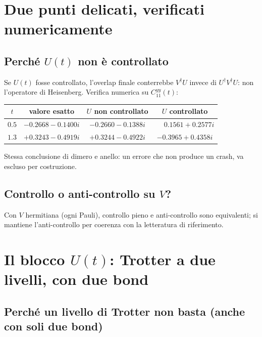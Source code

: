 \documentclass[11pt,a4paper]{article}
\begin{document}
\section{Due punti delicati, verificati numericamente}

\subsection{Perché $U(t)$ non è controllato}

Se $U(t)$ fosse controllato, l'overlap finale conterrebbe $V^\dagger U$ invece di
$U^\dagger V^\dagger U$: non l'operatore di Heisenberg. Verifica numerica su $C_{11}^{yy}(t)$:

\begin{center}
\begin{tabular}{cccc}
\toprule
$t$ & valore esatto & $U$ non controllato & $U$ controllato \\
\midrule
$0.5$ & $-0.2668-0.1400i$ & $-0.2660-0.1388i$ & $\phantom{-}0.1561+0.2577i$ \\
$1.3$ & $+0.3243-0.4919i$ & $+0.3244-0.4922i$ & $-0.3965+0.4358i$ \\
\bottomrule
\end{tabular}
\end{center}
Stessa conclusione di dimero e anello: un errore che non produce un crash, va escluso per
costruzione.

\subsection{Controllo o anti-controllo su $V$?}

Con $V$ hermitiana (ogni Pauli), controllo pieno e anti-controllo sono equivalenti; si mantiene
l'anti-controllo per coerenza con la letteratura di riferimento.

\section{Il blocco $U(t)$: Trotter a due livelli, con due bond}
\label{sec:trotter}

\subsection{Perché un livello di Trotter non basta (anche con soli due bond)}
\end{document}
